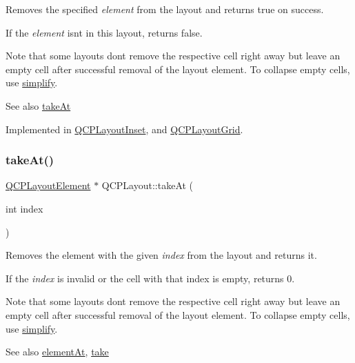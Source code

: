 Removes the specified {\itshape element} from the layout and returns true on success.

If the {\itshape element} isn\textquotesingle{}t in this layout, returns false.

Note that some layouts don\textquotesingle{}t remove the respective cell right away but leave an empty cell after successful removal of the layout element. To collapse empty cells, use \hyperlink{classQCPLayout_a41e6ac049143866e8f8b4964efab01b2}{simplify}.

\begin{DoxySeeAlso}{See also}
\hyperlink{classQCPLayout_a5a79621fa0a6eabb8b520cfc04fb601a}{take\+At} 
\end{DoxySeeAlso}


Implemented in \hyperlink{classQCPLayoutInset_af7f13cc369f8190b5e7e17d5f39dfe1c}{Q\+C\+P\+Layout\+Inset}, and \hyperlink{classQCPLayoutGrid_aee961c2eb6cf8a85dcbc5a7d7b6c1a00}{Q\+C\+P\+Layout\+Grid}.

\mbox{\label{classQCPLayout_a5a79621fa0a6eabb8b520cfc04fb601a}} 
\subsubsection{\texorpdfstring{take\+At()}{takeAt()}}
{\footnotesize\ttfamily \hyperlink{classQCPLayoutElement}{Q\+C\+P\+Layout\+Element} $\ast$ Q\+C\+P\+Layout\+::take\+At (\begin{DoxyParamCaption}\item[{int}]{index }\end{DoxyParamCaption})\hspace{0.3cm}{\ttfamily [pure virtual]}}

Removes the element with the given {\itshape index} from the layout and returns it.

If the {\itshape index} is invalid or the cell with that index is empty, returns 0.

Note that some layouts don\textquotesingle{}t remove the respective cell right away but leave an empty cell after successful removal of the layout element. To collapse empty cells, use \hyperlink{classQCPLayout_a41e6ac049143866e8f8b4964efab01b2}{simplify}.

\begin{DoxySeeAlso}{See also}
\hyperlink{classQCPLayout_afa73ca7d859f8a3ee5c73c9b353d2a56}{element\+At}, \hyperlink{classQCPLayout_ada26cd17e56472b0b4d7fbbc96873e4c}{take} 
\end{DoxySeeAlso}


